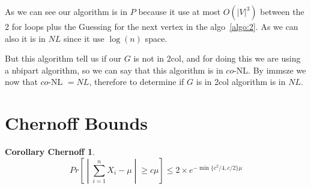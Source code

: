\documentclass[12pt, a4paper]{article}
\begin{document}
As we can see our algorithm is in $P$ because it use at most $O(|V|^3)$ between the 2 for loops plus the Guessing for the next vertex in the algo~\ref{algo:2}. As we can also it is in $NL$ since it use $\log(n)$ space.

But this algorithm tell us if our $G$ is not in \acrshort{2col}, and for doing this we are using a \acrshort{nbipart} algorithm, so we can say that this algorithm is in $co$-NL\@. By \acrfull{immsze} we now that $co$-NL $= NL$, therefore to determine if $G$ is in \acrshort{2col} algorithm is in $NL$.


\appendix
\section{Chernoff Bounds}
\label{col:chernoff}
\newtheorem{corollary_chernoff}{Corollary Chernoff}
\begin{corollary_chernoff}
  \begin{equation*}
    Pr\left[\middle|\sum_{i=1}^n X_i - \mu \middle| \geq c\mu\right] \leq 2 \times e^{-\min\{c^2/4,c/2\}\mu}
  \end{equation*}
\end{corollary_chernoff}
\end{document}
